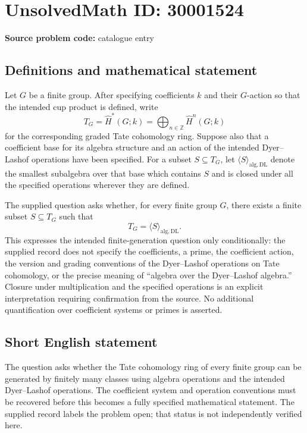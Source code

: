 \documentclass[11pt]{article}
\newcommand{\Z}{\mathbb{Z}}
\begin{document}
\section*{UnsolvedMath ID: 30001524}
\textbf{Source problem code:} catalogue entry
\subsection{Definitions and mathematical statement}
Let \(G\) be a finite group. After specifying coefficients \(k\) and their \(G\)-action so that the intended cup product is defined, write
\[
T_G=\widehat H^{*}(G;k)=\bigoplus_{n\in\Z}\widehat H^{n}(G;k)
\]
for the corresponding graded Tate cohomology ring. Suppose also that a coefficient base for its algebra structure and an action of the intended Dyer--Lashof operations have been specified. For a subset \(S\subseteq T_G\), let \(\langle S\rangle_{\mathrm{alg},\mathrm{DL}}\) denote the smallest subalgebra over that base which contains \(S\) and is closed under all the specified operations wherever they are defined.

The supplied question asks whether, for every finite group \(G\), there exists a finite subset \(S\subseteq T_G\) such that
\[
T_G=\langle S\rangle_{\mathrm{alg},\mathrm{DL}}.
\]
This expresses the intended finite-generation question only conditionally: the supplied record does not specify the coefficients, a prime, the coefficient action, the version and grading conventions of the Dyer--Lashof operations on Tate cohomology, or the precise meaning of ``algebra over the Dyer--Lashof algebra.'' Closure under multiplication and the specified operations is an explicit interpretation requiring confirmation from the source. No additional quantification over coefficient systems or primes is asserted.
\subsection{Short English statement}
The question asks whether the Tate cohomology ring of every finite group can be generated by finitely many classes using algebra operations and the intended Dyer--Lashof operations. The coefficient system and operation conventions must be recovered before this becomes a fully specified mathematical statement. The supplied record labels the problem open; that status is not independently verified here.
\end{document}

